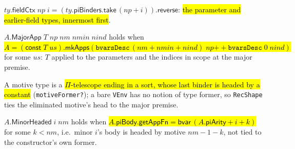 \begin{definition}
\label{def:ind-field-ctx}
\leanok
{} 

 $ty.\mathsf{fieldCtx}\;np\;i = (ty.\mathsf{piBinders}.\mathsf{take}\,(np+i)).\mathsf{reverse}$:
\hl{the parameter and earlier-field types, innermost first}.
\end{definition}

\begin{definition}
\label{def:ind-major-app}
\leanok
{} 

 $A.\mathsf{MajorApp}\;T\;np\;nm\;nmin\;nind$ holds when
\hl{$A = (\mathsf{const}\;T\;us).\mathsf{mkApps}(\texttt{bvarsDesc}\,(nm{+}nmin{+}nind)\;np
\mathbin{+\!\!+} \texttt{bvarsDesc}\;0\;nind)$} for some $us$: $T$ applied to the parameters and
the indices in scope at the major premise.
\end{definition}

\begin{definition}
\label{def:ind-motive-shape}
\leanok
{} 

 A motive type is a \hl{$\Pi$-telescope ending in a sort, whose last binder
is headed by a constant} (\texttt{motiveFormer?}); a bare \texttt{VEnv} has no notion of
type former, so \texttt{RecShape} ties the eliminated motive's head to the major premise.
\end{definition}

\begin{definition}
\label{def:ind-minor-headed}
\leanok
{} 

 $A.\mathsf{MinorHeaded}\;i\;nm$ holds when
\hl{$A.\mathsf{piBody}.\mathsf{getAppFn} = \mathsf{bvar}\,(A.\mathsf{piArity}+i+k)$} for some
$k<nm$, i.e.\ minor $i$'s body is headed by motive $nm-1-k$, not tied to the constructor's
own former.
\end{definition}


